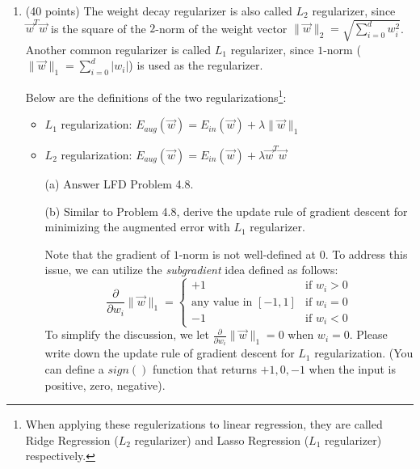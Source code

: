 \documentclass[11pt]{article}
\begin{document}
\begin{enumerate}

\item (40 points)
The weight decay regularizer is also called $L_2$ regularizer, since $\vec{w}^T\vec{w}$ is the square of the $2$-norm of the weight vector $\|\vec{w}\|_2=\sqrt{\sum_{i=0}^d w_i^2}$.
Another common regularizer is called $L_1$ regularizer, since $1$-norm ($\|\vec{w}\|_1=\sum_{i=0}^d |w_i|$) is used as the regularizer.

\vspace{1pt}
Below are the definitions of the two regularizations\footnote{When applying these regulerizations to linear regression, they are called Ridge Regression ($L_2$ regularizer) and Lasso Regression ($L_1$ regularizer) respectively.}:
\begin{itemize}
    \item $L_1$ regularization: $E_{aug}(\vec{w})=E_{in}(\vec{w})+\lambda \|\vec{w}\|_1$
    \item $L_2$ regularization: $E_{aug}(\vec{w})=E_{in}(\vec{w})+\lambda \vec{w}^T\vec{w}$
\end{itemize}


\begin{itemize}
    \item[(a)] Answer LFD Problem 4.8. 
    \item[(b)] Similar to Problem 4.8, derive the update rule of gradient descent for minimizing the augmented error with $L_1$ regularizer. 

    Note that the gradient of $1$-norm is not well-defined at $0$. 
    To address this issue, we can utilize the \emph{subgradient} idea defined as follows:
    \vspace{-10pt}
    \[
        \frac{\partial}{\partial w_i} \|\vec{w}\|_1 =
        \begin{cases}
            +1 & \mbox{if $w_i > 0$}\\
            \mbox{any value in $[-1,1]$} & \mbox{if $w_i = 0$}\\
            -1 & \mbox{if $w_i < 0$}
        \end{cases}
    \]
    To simplify the discussion, we let $\frac{\partial}{\partial w_i} \|\vec{w}\|_1=0$ when $w_i=0$. 
    Please write down the update rule of gradient descent for $L_1$ regularization. (You can define a $sign()$ function that returns $+1, 0, -1$ when the input is positive, zero, negative).
    

\end{itemize}
\end{enumerate}
\end{document}
